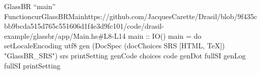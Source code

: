\begin{haskell}{GlassBR ``main'' Function}{curGlassBRMain}{https://github.com/JacquesCarette/Drasil/blob/9f435cbb9bcda515d765c551606d1f4e3d9fc101/code/drasil-example/glassbr/app/Main.hs\#L8-L14}
main :: IO()
main = do
  setLocaleEncoding utf8
  gen (DocSpec (docChoices SRS [HTML, TeX]) "GlassBR_SRS") srs printSetting
  genCode choices code
  genDot fullSI
  genLog fullSI printSetting
\end{haskell}
